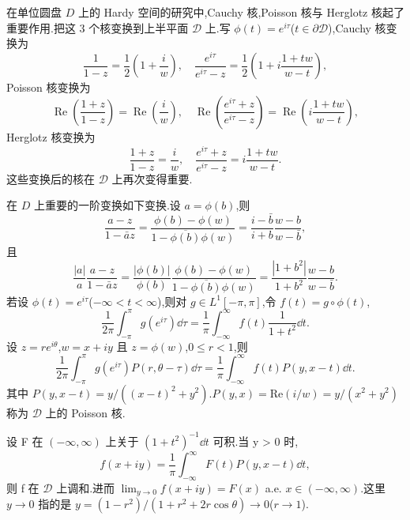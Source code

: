 在单位圆盘 $D$ 上的 Hardy 空间的研究中,Cauchy 核,Poisson 核与 Herglotz 核起了重要作用.把这 3 个核变换到上半平面 $\mathcal{D}$ 上.写 $\phi(t) = e^{i\tau}$($t \in \partial \mathcal{D}$),Cauchy 核变换为
\begin{equation*}
\frac{1}{1 - z} = \frac{1}{2}\left(1 + \frac{i}{w}\right), \quad \frac{e^{i\tau}}{e^{i\tau} - z} = \frac{1}{2}\left(1 + i\frac{1 + tw}{w - t}\right),
\end{equation*}
Poisson 核变换为
\begin{equation*}
\operatorname{Re}\left(\frac{1 + z}{1 - z}\right) = \operatorname{Re}\left(\frac{i}{w}\right), \quad \operatorname{Re}\left(\frac{e^{i\tau} + z}{e^{i\tau} - z}\right) = \operatorname{Re}\left(i\frac{1 + tw}{w - t}\right),
\end{equation*}
Herglotz 核变换为
\begin{equation*}
\frac{1 + z}{1 - z} = \frac{i}{w}, \quad \frac{e^{i\tau} + z}{e^{i\tau} - z} = i\frac{1 + tw}{w - t}.
\end{equation*}
这些变换后的核在 $\mathcal{D}$ 上再次变得重要.

在 $D$ 上重要的一阶变换如下变换.设 $a = \phi(b)$,则
\begin{equation*}
\frac{a - z}{1 - \bar{a}z} = \frac{\phi(b) - \phi(w)}{1 - \overline{\phi(b)}\phi(w)} = \frac{i - \bar{b}}{i + b}\frac{w - b}{w - \bar{b}},
\end{equation*}
且
\begin{equation*}
\frac{|a|}{a}\frac{a - z}{1 - \bar{a}z} = \frac{|\phi(b)|}{\phi(b)}\frac{\phi(b) - \phi(w)}{1 - \overline{\phi(b)}\phi(w)} = \frac{|1 + b^{2}|}{1 + b^{2}}\frac{w - b}{w - \bar{b}}.
\end{equation*}
若设 $\phi(t) = e^{i\tau}$($-\infty < t < \infty$),则对 $g \in L^{1}[-\pi, \pi]$,令 $f(t) = g \circ \phi(t)$,
\begin{equation*}
\frac{1}{2\pi}\int_{-\pi}^{\pi} g(e^{i\tau})\dd \tau = \frac{1}{\pi}\int_{-\infty}^{\infty} f(t)\frac{1}{1 + t^{2}}\dd t.
\end{equation*}
设 $z = re^{i\theta}$,$w = x + iy$ 且 $z = \phi(w)$,$0 \leq r < 1$,则
\begin{equation*}
\frac{1}{2\pi}\int_{-\pi}^{\pi} g(e^{i\tau})P(r, \theta - \tau)\dd \tau = \frac{1}{\pi}\int_{-\infty}^{\infty} f(t)P(y, x - t)\dd t.
\end{equation*}
其中 $P(y, x - t) = y/((x-t)^{2} + y^{2})$.$P(y, x) = \mathrm{Re}(i/w) = y/(x^{2} + y^{2})$ 称为 $\mathcal{D}$ 上的 Poisson 核.

\begin{theorem}\label{thm:2.20.1}
设 F 在 $(-\infty, \infty)$ 上关于 $(1 + t^{2})^{-1}\dd t$ 可积.当 y > 0 时,
\begin{equation*}
f(x + iy) = \frac{1}{\pi}\int_{-\infty}^{\infty} F(t)P(y, x - t)\dd t,
\end{equation*}
则 f 在 $\mathcal{D}$ 上调和.进而 $\lim_{y \to 0}f(x + iy) = F(x)$ a.e. $x \in (-\infty, \infty)$.这里 $y \to 0$ 指的是 $y = (1 - r^{2})/(1 + r^{2} + 2r\cos\theta) \to 0$($r \to 1$).
\end{theorem}

